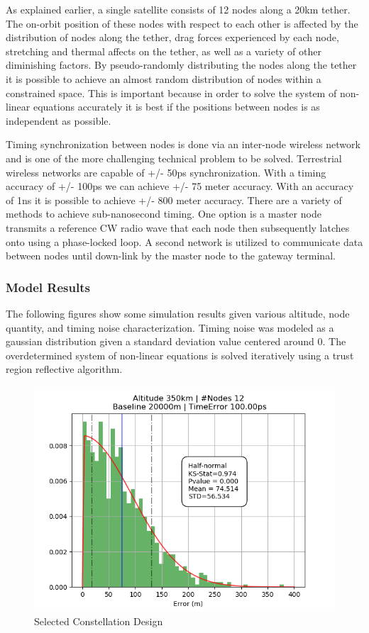 \documentclass{article}
\begin{document}
As explained earlier, a single satellite consists of 12 nodes along a 20km tether. The on-orbit position of these nodes with respect to each other is affected by the distribution of nodes along the tether, drag forces experienced by each node, stretching and thermal affects on the tether, as well as a variety of other diminishing factors. By pseudo-randomly distributing the nodes along the tether it is possible to achieve an almost random distribution of nodes within a constrained space. This is important because in order to solve the system of non-linear equations accurately it is best if the positions between nodes is as independent as possible.

Timing synchronization between nodes is done via an inter-node wireless network and is one of the more challenging technical problem to be solved. Terrestrial wireless networks are capable of +/- 50ps synchronization. With a timing accuracy of +/- 100ps we can achieve +/- 75 meter accuracy. With an accuracy of 1ns it is possible to achieve +/- 800 meter accuracy. There are a variety of methods to achieve sub-nanosecond timing. One option is a master node transmits a reference CW radio wave that each node then subsequently latches onto using a phase-locked loop. A second network is utilized to communicate data between nodes until down-link by the master node to the gateway terminal. 

\subsubsection{Model Results}
The following figures show some simulation results given various altitude, node quantity, and timing noise characterization. Timing noise was modeled as a gaussian distribution given a standard deviation value centered around 0. The overdetermined system of non-linear equations is solved iteratively using a trust region reflective algorithm.

\begin{figure}[H]
  \centering
  \includegraphics[width=.75\linewidth]{figures/graphs/350_12_20000_100}
  \caption{Selected Constellation Design}
\end{figure}
\end{document}
